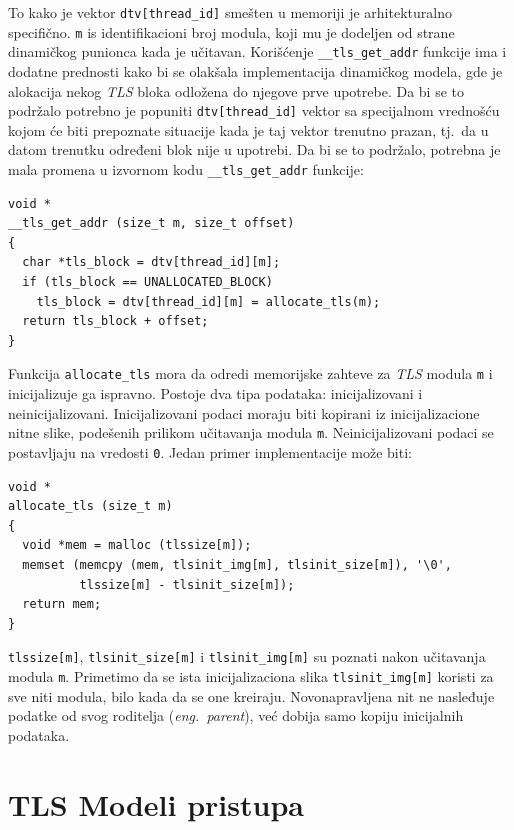 \documentclass[12pt,oneside]{memoir}
\begin{document}
To kako je vektor \texttt{dtv[thread\_id]} smešten u memoriji je arhitekturalno specifično. \texttt{m} is identifikacioni broj modula, koji mu je dodeljen od strane dinamičkog punionca kada je učitavan. Korišćenje \texttt{\_\_tls\_get\_addr} funkcije ima i dodatne prednosti kako bi se olakšala implementacija dinamičkog modela, gde je alokacija nekog \emph{TLS} bloka odložena do njegove prve upotrebe. Da bi se to podržalo potrebno je popuniti \texttt{dtv[thread\_id]} vektor sa specijalnom vrednošću kojom će biti prepoznate situacije kada je taj vektor trenutno prazan, tj.~da u datom trenutku određeni blok nije u upotrebi. Da bi se to podržalo, potrebna je mala promena u izvornom kodu \texttt{\_\_tls\_get\_addr} funkcije:

\begin{lstlisting}[style=customc]
void *
__tls_get_addr (size_t m, size_t offset)
{
  char *tls_block = dtv[thread_id][m];
  if (tls_block == UNALLOCATED_BLOCK)
    tls_block = dtv[thread_id][m] = allocate_tls(m);
  return tls_block + offset;
}

\end{lstlisting}

Funkcija \texttt{allocate\_tls} mora da odredi memorijske zahteve za \emph{TLS} modula \texttt{m} i inicijalizuje ga ispravno. Postoje dva tipa podataka: inicijalizovani i neinicijalizovani. Inicijalizovani podaci moraju biti kopirani iz inicijalizacione nitne slike, podešenih prilikom učitavanja modula \texttt{m}. Neinicijalizovani podaci se postavljaju na vredosti \texttt{0}. Jedan primer implementacije može biti:\newpage

\begin{lstlisting}[style=customc]
void *
allocate_tls (size_t m)
{
  void *mem = malloc (tlssize[m]);
  memset (memcpy (mem, tlsinit_img[m], tlsinit_size[m]), '\0',
          tlssize[m] - tlsinit_size[m]);
  return mem;
}

\end{lstlisting}

\texttt{tlssize[m]}, \texttt{tlsinit\_size[m]} i \texttt{tlsinit\_img[m]} su poznati nakon učitavanja modula \texttt{m}. Primetimo da se ista inicijalizaciona slika \texttt{tlsinit\_img[m]} koristi za sve niti modula, bilo kada da se one kreiraju. Novonapravljena nit ne nasleđuje podatke od svog roditelja (\emph{eng.~parent}), već dobija samo kopiju inicijalnih podataka.

\section{TLS Modeli pristupa}
\end{document}
